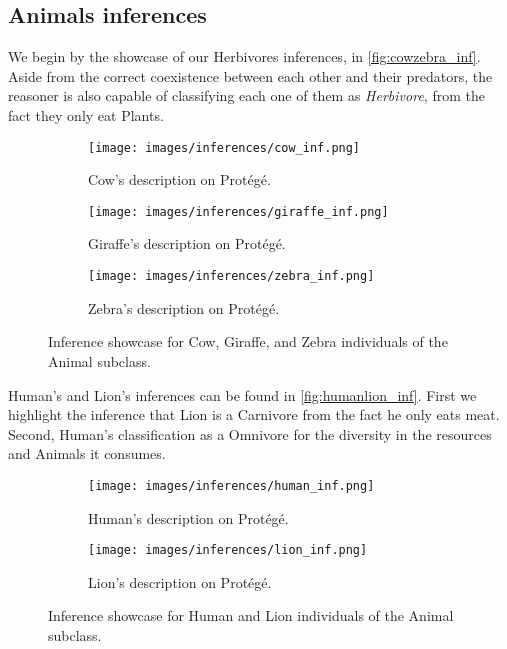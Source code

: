 \newpage

\subsection{Animals inferences}

We begin by the showcase of our Herbivores inferences, in \autoref{fig:cowzebra_inf}. Aside from the correct coexistence between each other and their predators, the reasoner is also capable of classifying each one of them as \textit{Herbivore}, from the fact they only eat Plants.

\begin{figure}[h!]
    \centering
    \begin{subfigure}[b]{0.8\linewidth}
      \texttt{[image: images/inferences/cow\_inf.png]}
      \caption{Cow's description on Protégé.}
    \end{subfigure}
    \begin{subfigure}[b]{0.8\linewidth}
      \texttt{[image: images/inferences/giraffe\_inf.png]}
      \caption{Giraffe's description on Protégé.}
    \end{subfigure}
    \begin{subfigure}[b]{0.8\linewidth}
        \texttt{[image: images/inferences/zebra\_inf.png]}
        \caption{Zebra's description on Protégé.}
      \end{subfigure}
    \caption{Inference showcase for Cow, Giraffe, and Zebra individuals of the Animal subclass.}
    \label{fig:cowzebra_inf}
\end{figure}

\newpage

Human's and Lion's inferences can be found in \autoref{fig:humanlion_inf}. First we highlight the inference that Lion is a Carnivore from the fact he only eats meat. Second, Human's classification as a Omnivore for the diversity in the resources and Animals it consumes.

\begin{figure}[h!]
    \centering
    \begin{subfigure}[b]{0.8\linewidth}
      \texttt{[image: images/inferences/human\_inf.png]}
      \caption{Human's description on Protégé.}
    \end{subfigure}
    \begin{subfigure}[b]{0.8\linewidth}
      \texttt{[image: images/inferences/lion\_inf.png]}
      \caption{Lion's description on Protégé.}
    \end{subfigure}
    
    \caption{Inference showcase for Human and Lion individuals of the Animal subclass.}
    \label{fig:humanlion_inf}
\end{figure}

